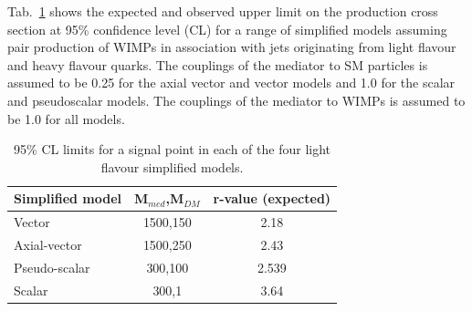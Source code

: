 
Tab.~\ref{tab:limits} shows
the expected and observed upper limit on the
production cross section at 95\% confidence level (CL) for a range of simplified models assuming
pair production of WIMPs in association with jets originating from light flavour and heavy flavour quarks. The couplings of the mediator to SM particles is assumed to be 0.25 for the axial vector and vector models and 1.0 for the scalar and pseudoscalar models. The couplings of the mediator to WIMPs is assumed to be 1.0 for all models. 

\begin{table}[h!]
  \caption{%
    95\% CL limits for a signal point in each of the four light flavour simplified models. }
  \label{tab:limits}
  \centering
  \begin{tabular}{ lcc }
    \hline
    \hline
    Simplified model              & M$_{med}$,M$_{DM}$          & r-value (expected) \\ \hline
Vector & 1500,150 & 2.18 \\
Axial-vector & 1500,250 & 2.43 \\
Pseudo-scalar & 300,100 & 2.539 \\
Scalar & 300,1 & 3.64 \\
    \hline
    \hline
  \end{tabular}
\end{table}



